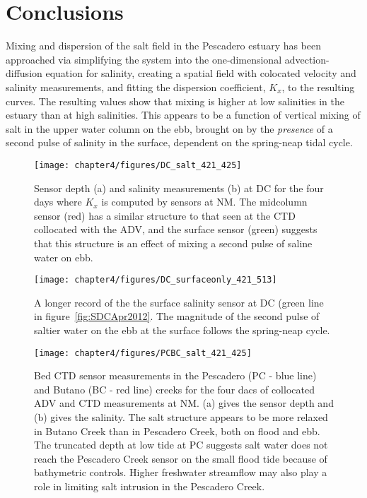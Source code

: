 \section{Conclusions}

Mixing and dispersion of the salt field in the Pescadero estuary has been approached via simplifying the system into the one-dimensional advection-diffusion equation for salinity, creating a spatial field with colocated velocity and salinity measurements, and fitting the dispersion coefficient, $K_x$, to the resulting curves. The resulting values show that mixing is higher at low salinities in the estuary than at high salinities. This appears to be a function of vertical mixing of salt in the upper water column on the ebb, brought on by the \emph{presence} of a second pulse of salinity in the surface, dependent on the spring-neap tidal cycle.  






\begin{figure}
	\texttt{[image: chapter4/figures/DC\_salt\_421\_425]}
	\caption{Sensor depth (a) and salinity measurements (b) at DC for the four days where $K_x$ is computed by sensors at NM. The midcolumn sensor (red) has a similar structure to that seen at the CTD collocated with the ADV, and the surface sensor (green) suggests that this structure is an effect of mixing a second pulse of saline water on ebb.} \label{fig:SDCApr2012} \label{fig:DC_salt_421_425}
\end{figure}


\begin{figure}
	\texttt{[image: chapter4/figures/DC\_surfaceonly\_421\_513]}
	\caption{A longer record of the the surface salinity sensor at DC (green line in figure~\ref{fig:SDCApr2012}. The magnitude of the second pulse of saltier water on the ebb at the surface follows the spring-neap cycle.} \label{fig:SsurfLT}
\end{figure}


\begin{figure}
	\texttt{[image: chapter4/figures/PCBC\_salt\_421\_425]}
	\caption{Bed CTD sensor measurements in the Pescadero (PC - blue line) and Butano (BC  - red line) creeks for the four dacs of collocated ADV and CTD measurements at NM. (a) gives the sensor depth and (b) gives the salinity. The salt structure appears to be more relaxed in Butano Creek than in Pescadero Creek, both on flood and ebb. The truncated depth at low tide at PC suggests salt water does not reach the Pescadero Creek sensor on the small flood tide because of bathymetric controls. Higher freshwater streamflow may also play a role in limiting salt intrusion in the Pescadero Creek.} \label{fig:PCBC421:425}
\end{figure}



